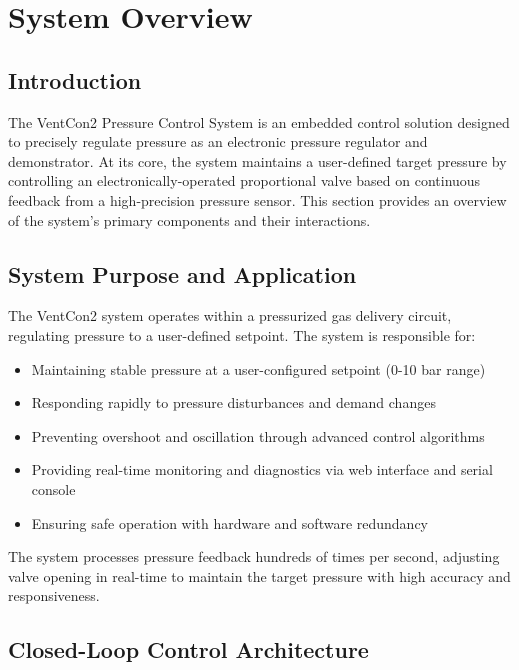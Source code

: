 
\section{System Overview}

\subsection{Introduction}

The VentCon2 Pressure Control System is an embedded control solution designed to precisely regulate pressure as an electronic pressure regulator and demonstrator. At its core, the system maintains a user-defined target pressure by controlling an electronically-operated proportional valve based on continuous feedback from a high-precision pressure sensor. This section provides an overview of the system's primary components and their interactions.

\subsection{System Purpose and Application}

The VentCon2 system operates within a pressurized gas delivery circuit, regulating pressure to a user-defined setpoint. The system is responsible for:

    \begin{itemize}
        \item Maintaining stable pressure at a user-configured setpoint (0-10 bar range)
        \item Responding rapidly to pressure disturbances and demand changes
        \item Preventing overshoot and oscillation through advanced control algorithms
        \item Providing real-time monitoring and diagnostics via web interface and serial console
        \item Ensuring safe operation with hardware and software redundancy
    \end{itemize}

The system processes pressure feedback hundreds of times per second, adjusting valve opening in real-time to maintain the target pressure with high accuracy and responsiveness.

\subsection{Closed-Loop Control Architecture}

